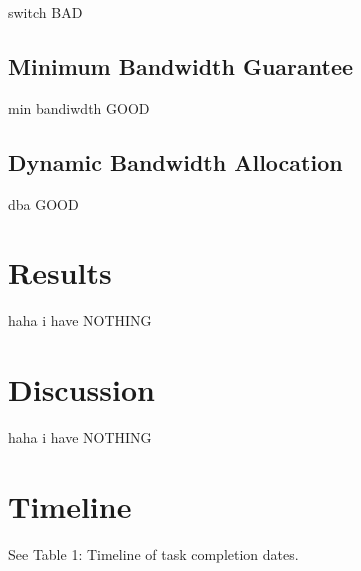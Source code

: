 \documentclass[accepted,single]{gipaper}
\begin{document}
switch BAD

\subsection{Minimum Bandwidth Guarantee}
\label{min_bandwidth}

min bandiwdth GOOD

\subsection{Dynamic Bandwidth Allocation}
\label{min_bandwidth}

dba GOOD

\section{Results}
\label{results}

haha i have NOTHING

\section{Discussion}
\label{discussion}

haha i have NOTHING

\section{Timeline}
\label{timeline}

See Table 1: Timeline of task completion dates.
\end{document}
